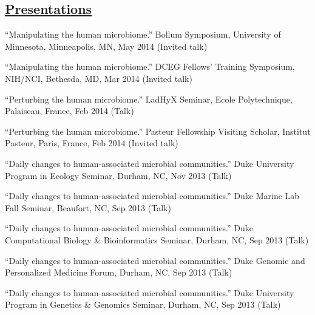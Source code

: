 \documentclass[overlapped,line,11pt]{res}
\begin{document}
\begin{resume}
\section{\underline{\sc Presentations}}
\vspace{.25in}

\begin{revnumerate}[28]

\item {``Manipulating the human microbiome.''
  Bollum Symposium, University of Minnesota, Minneapolis, MN, May 2014
  (Invited talk)}
\vspace*{0mm}

\item {``Manipulating the human microbiome.''
  DCEG Fellows’ Training Symposium, NIH/NCI, Bethesda, MD, Mar 2014
  (Invited talk)}
\vspace*{0mm}

\item {``Perturbing the human microbiome.''  LadHyX Seminar, Ecole
  Polytechnique, Palaiseau, France, Feb 2014 (Talk)}
\vspace*{0mm}

\item {``Perturbing the human microbiome.''
  Pasteur Fellowship Visiting Scholar, Institut Pasteur,
  Paris, France, Feb 2014 (Invited talk)}
\vspace*{0mm}

\item {``Daily changes to human-associated microbial communities.''
  Duke University Program in Ecology Seminar,
  Durham, NC, Nov 2013 (Talk)}
\vspace*{0mm}

\item {``Daily changes to human-associated microbial communities.''
  Duke Marine Lab Fall Seminar,
  Beaufort, NC, Sep 2013 (Talk)}
\vspace*{0mm}

\item {``Daily changes to human-associated microbial communities.''
  Duke Computational Biology \& Bioinformatics Seminar,
  Durham, NC, Sep 2013 (Talk)}
\vspace*{0mm}

\item {``Daily changes to human-associated microbial communities.''
  Duke Genomic and Personalized Medicine Forum,
  Durham, NC, Sep 2013 (Talk)}
\vspace*{0mm}

\item {``Daily changes to human-associated microbial communities.''
  Duke University Program in Genetics \& Genomics Seminar,
  Durham, NC, Sep 2013 (Talk)}
\vspace*{0mm}


\end{revnumerate}
\end{resume}
\end{document}
